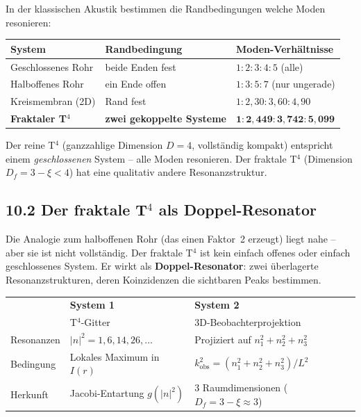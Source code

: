 In der klassischen Akustik bestimmen die Randbedingungen welche Moden
resonieren:

\begin{center}
\begin{tabular}{p{3.8cm}p{3.4cm}p{5.2cm}}
\toprule
\textbf{System} & \textbf{Randbedingung} & \textbf{Moden-Verhältnisse} \\
\midrule
Geschlossenes Rohr & beide Enden fest & $1:2:3:4:5$ (alle) \\
Halboffenes Rohr & ein Ende offen & $1:3:5:7$ (nur ungerade) \\
Kreismembran (2D) & Rand fest & $1:2{,}30:3{,}60:4{,}90$ \\
\midrule
\textbf{Fraktaler T$^4$} & \textbf{zwei gekoppelte Systeme} &
  $\mathbf{1:2{,}449:3{,}742:5{,}099}$ \\
\bottomrule
\end{tabular}
\end{center}

Der reine T$^4$ (ganzzahlige Dimension $D=4$, vollständig kompakt)
entspricht einem \emph{geschlossenen} System -- alle Moden resonieren.
Der fraktale T$^4$ (Dimension $D_f = 3-\xi < 4$) hat eine
qualitativ andere Resonanzstruktur.

\subsection*{10.2 Der fraktale T$^4$ als Doppel-Resonator}

Die Analogie zum halboffenen Rohr (das einen Faktor~2 erzeugt) liegt
nahe -- aber sie ist nicht vollständig. Der fraktale T$^4$ ist
kein einfach offenes oder einfach geschlossenes System. Er wirkt
als \textbf{Doppel-Resonator}: zwei überlagerte Resonanzstrukturen,
deren Koinzidenzen die sichtbaren Peaks bestimmen.

\begin{center}
\begin{tabular}{p{3cm}p{5cm}p{5cm}}
\toprule
 & \textbf{System 1} & \textbf{System 2} \\
 & T$^4$-Gitter & 3D-Beobachterprojektion \\
\midrule
Resonanzen & $|n|^2 = 1, 6, 14, 26, \ldots$ &
  Projiziert auf $n_1^2+n_2^2+n_3^2$ \\
Bedingung & Lokales Maximum in $I(r)$ &
  $k_\mathrm{obs}^2 = (n_1^2+n_2^2+n_3^2)/L^2$ \\
Herkunft & Jacobi-Entartung $g(|n|^2)$ &
  3 Raumdimensionen ($D_f = 3-\xi \approx 3$) \\
\bottomrule
\end{tabular}
\end{center}

